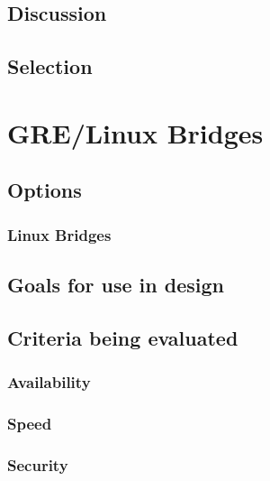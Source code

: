 \documentclass[10pt,letterpaper,onecolumn,draftclsnofoot]{IEEEtran}
\begin{document}
\subsection{Discussion}


\subsection{Selection}


\section{GRE/Linux Bridges}

\subsection{Options}

\subsubsection{Linux Bridges}

\subsubsection{}

\subsubsection{}

\subsection{Goals for use in design}

\subsection{Criteria being evaluated}

\subsubsection{Availability}

\subsubsection{Speed}

\subsubsection{Security}
\end{document}
